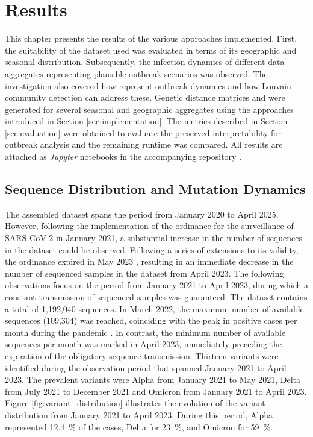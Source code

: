 \section{Results}
\label{cha:results}
This chapter presents the results of the various approaches implemented. First, the suitability of the dataset used was evaluated in terms of its geographic and seasonal distribution. Subsequently, the infection dynamics of different data aggregates representing plausible outbreak scenarios was observed. The investigation also covered how  represent outbreak dynamics and how Louvain community detection can address these. Genetic distance matrices and  were generated for several seasonal and geographic aggregates using the approaches introduced in Section \ref{sec:implementation}. The metrics described in Section \ref{sec:evaluation} were obtained to evaluate the preserved interpretability for outbreak analysis and the remaining runtime was compared. All results are attached as \textit{Jupyter} notebooks in the accompanying repository \cite{Git1}.

\subsection{Sequence Distribution and Mutation Dynamics}
\label{sec:data_analysis_results}
The assembled dataset spans the period from January 2020 to April 2025. However, following the implementation of the ordinance for the surveillance of SARS-CoV-2 in January 2021, a substantial increase in the number of sequences in the dataset could be observed. Following a series of extensions to its validity, the ordinance expired in May 2023 \cite{Rki1}, resulting in an immediate decrease in the number of sequenced samples in the dataset from April 2023. The following observations focus on the period from January 2021 to April 2023, during which a constant transmission of sequenced samples was guaranteed. The dataset contains a total of 1,192,040 sequences. In March 2022, the maximum number of available sequences (109,304) was reached, coinciding with the peak in positive cases per month during the pandemic \cite{Rki3}. In contrast, the minimum number of available sequences per month was marked in April 2023, immediately preceding the expiration of the obligatory sequence transmission.
Thirteen variants were identified during the observation period that spanned January 2021 to April 2023. The prevalent variants were Alpha from January 2021 to May 2021, Delta from July 2021 to December 2021 and Omicron from January 2021 to April 2023. Figure \ref{fig:variant_distribution} illustrates the evolution of the variant distribution from January 2021 to April 2023. During this period, Alpha represented 12.4~\% of the cases, Delta for 23~\%, and Omicron for 59~\%.


